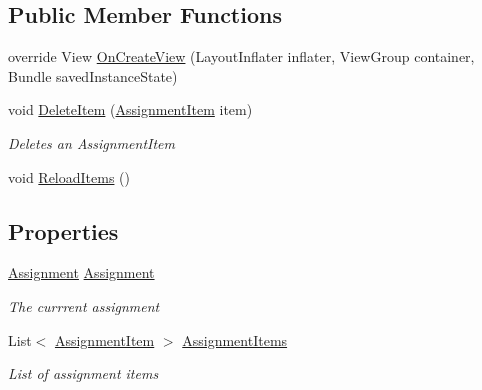 \subsection*{Public Member Functions}
\begin{DoxyCompactItemize}
\item 
override View \hyperlink{class_field_service_1_1_android_1_1_fragments_1_1_item_fragment_adb6df6db1a42ab18cf26f2d189ad29ae}{On\+Create\+View} (Layout\+Inflater inflater, View\+Group container, Bundle saved\+Instance\+State)
\item 
void \hyperlink{class_field_service_1_1_android_1_1_fragments_1_1_item_fragment_a98f53ba8107409cf6bc226142f6e9e85}{Delete\+Item} (\hyperlink{class_field_service_1_1_data_1_1_assignment_item}{Assignment\+Item} item)
\begin{DoxyCompactList}\small\item\em Deletes an Assignment\+Item \end{DoxyCompactList}\item 
void \hyperlink{class_field_service_1_1_android_1_1_fragments_1_1_item_fragment_aad46746b5d8f4ca53c1da48928d8b263}{Reload\+Items} ()
\end{DoxyCompactItemize}
\subsection*{Properties}
\begin{DoxyCompactItemize}
\item 
\hyperlink{class_field_service_1_1_data_1_1_assignment}{Assignment} \hyperlink{class_field_service_1_1_android_1_1_fragments_1_1_item_fragment_a1642dd7b67b41927651295ad4fc4ec54}{Assignment}
\begin{DoxyCompactList}\small\item\em The currrent assignment \end{DoxyCompactList}\item 
List$<$ \hyperlink{class_field_service_1_1_data_1_1_assignment_item}{Assignment\+Item} $>$ \hyperlink{class_field_service_1_1_android_1_1_fragments_1_1_item_fragment_a7fb87c3e23b1ee6a3b241ca1a748b354}{Assignment\+Items}
\begin{DoxyCompactList}\small\item\em List of assignment items \end{DoxyCompactList}\end{DoxyCompactItemize}


